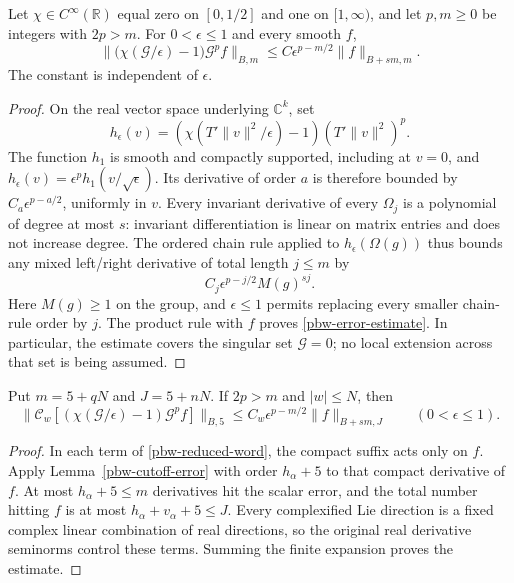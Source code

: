 \begin{lemma}
\label{pbw-cutoff-error}
Let $\chi\in C^\infty(\mathbb R)$ equal zero on $[0,1/2]$
and one on $[1,\infty)$, and let $p,m\ge0$ be integers with
$2p>m$.  For $0<\epsilon\le1$ and every smooth $f$,
\begin{equation}\label{pbw-error-estimate}
 \|\bigl(\chi(\mathcal G/\epsilon)-1\bigr)
                \mathcal G^pf\|_{B,m}
 \le C\epsilon^{p-m/2}\|f\|_{B+sm,m}.
\end{equation}
The constant is independent of $\epsilon$.
\end{lemma}

\begin{proof}
On the real vector space underlying $\mathbb C^k$, set
\[
 h_\epsilon(v)=
 (\chi(T'\|v\|^2/\epsilon)-1)(T'\|v\|^2)^p.
\]
The function $h_1$ is smooth and compactly supported, including
at $v=0$, and
$h_\epsilon(v)=\epsilon^ph_1(v/\sqrt\epsilon)$.
Its derivative of order $a$ is therefore bounded by
$C_a\epsilon^{p-a/2}$, uniformly in $v$.
Every invariant derivative of every $\Omega_j$ is a polynomial
of degree at most $s$: invariant differentiation is linear on
matrix entries and does not increase degree.  The ordered chain
rule applied to $h_\epsilon(\Omega(g))$ thus bounds any mixed
left/right derivative of total length $j\le m$ by
\[
 C_j\epsilon^{p-j/2}M(g)^{sj}.
\]
Here $M(g)\ge1$ on the group, and $\epsilon\le1$ permits
replacing every smaller chain-rule order by $j$.  The product
rule with $f$ proves \eqref{pbw-error-estimate}.  In particular,
the estimate covers the singular set $\mathcal G=0$; no local
extension across that set is being assumed.
\end{proof}

\begin{corollary}\label{pbw-cutoff-word-error}
Put $m=5+qN$ and $J=5+nN$.  If $2p>m$ and $|w|\le N$, then
\[
 \|\mathcal C_w[(\chi(\mathcal G/\epsilon)-1)
                         \mathcal G^pf]\|_{B,5}
 \le C_w\epsilon^{p-m/2}\|f\|_{B+sm,J}
                 \qquad(0<\epsilon\le1).
\]
\end{corollary}

\begin{proof}
In each term of \eqref{pbw-reduced-word}, the compact suffix
acts only on $f$.  Apply Lemma~\ref{pbw-cutoff-error} with
order $h_\alpha+5$ to that compact derivative of $f$.
At most $h_\alpha+5\le m$ derivatives hit the scalar error,
and the total number hitting $f$ is at most
$h_\alpha+v_\alpha+5\le J$.  Every complexified Lie direction
is a fixed complex linear combination of real directions, so
the original real derivative seminorms control these terms.
Summing the finite expansion proves the estimate.
\end{proof}

